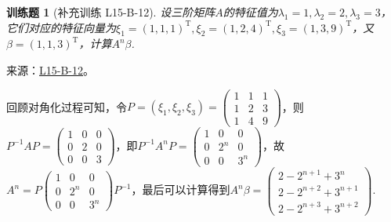 \documentclass[UTF8,12pt,a4paper,fontset=fandol]{ctexart}
\newtheorem{exercise}{训练题}[section]
\begin{document}
\begin{exercise}[补充训练 L15-B-12]\label{prob:L15-B-12}
设三阶矩阵$A$的特征值为$\lambda_1=1,\lambda_2=2,\lambda_3=3$，它们对应的特征向量为$\xi_1=(1,1,1)^\mathrm{T}, \xi_2=(1,2,4)^\mathrm{T},\xi_3=(1,3,9)^\mathrm{T}$，又$\beta=(1,1,3)^\mathrm{T}$，计算$A^n\beta$.
\end{exercise}
\noindent 来源：\href{https://github.com/yhwu-is/Linear-Algebra-Left-Undone/blob/new/%E8%AE%B2%E4%B9%89/%E4%B8%93%E9%A2%98/15%20%E7%9B%B8%E4%BC%BC%E6%A0%87%E5%87%86%E5%BD%A2%EF%BC%9A%E5%A4%8D%E6%95%B0%E5%9F%9F%E4%B8%8A%E7%9A%84%E5%B0%9D%E8%AF%95%E4%B8%8E%E7%90%86%E8%AE%BA.tex}{L15-B-12}。
\begin{solve}
回顾对角化过程可知，令$P=(\xi_1,\xi_2,\xi_3)=\begin{pmatrix}
                1 & 1 & 1 \\ 1 & 2 & 3 \\ 1 & 4 & 9
            \end{pmatrix}$，则$P^{-1}AP=\begin{pmatrix}
                1 & 0 & 0 \\ 0 & 2 & 0 \\ 0 & 0 & 3
            \end{pmatrix}$，即$P^{-1}A^nP=\begin{pmatrix}
                1 & 0 & 0 \\ 0 & 2^n & 0 \\ 0 & 0 & 3^n
            \end{pmatrix}$，故$A^n=P\begin{pmatrix}
                1 & 0 & 0 \\ 0 & 2^n & 0 \\ 0 & 0 & 3^n
            \end{pmatrix}P^{-1}$，最后可以计算得到$A^n\beta=\begin{pmatrix}
                2-2^{n+1}+3^n \\ 2-2^{n+2}+3^{n+1} \\ 2-2^{n+3}+3^{n+2}
            \end{pmatrix}$.
\end{solve}
\end{document}
